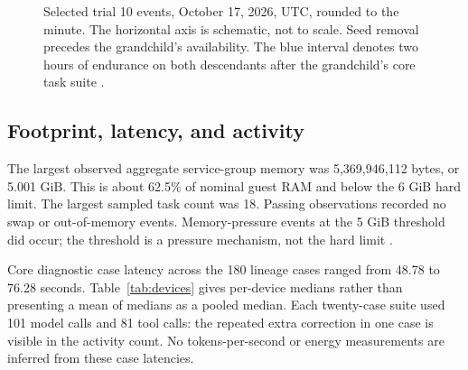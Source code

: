 \documentclass[11pt,letterpaper]{article}
\begin{document}
\begin{figure}[htbp]
\centering
{}
\caption{Selected trial 10 events, October 17, 2026, UTC, rounded to the minute.
The horizontal axis is schematic, not to scale. Seed removal precedes the
grandchild's availability. The blue interval denotes two hours of endurance
on both descendants after the grandchild's core task suite
\cite{lineages}.}
\label{fig:timeline}
\end{figure}

\subsection{Footprint, latency, and activity}

The largest observed aggregate service-group memory was 5,369,946,112 bytes,
or 5.001 GiB. This is about 62.5\% of nominal guest RAM and below the 6 GiB
hard limit. The largest sampled task count was 18. Passing observations recorded
no swap or out-of-memory events. Memory-pressure events at the 5 GiB threshold
did occur; the threshold is a pressure mechanism, not the hard limit
\cite{measurements,native,lineages}.

Core diagnostic case latency across the 180 lineage cases ranged from 48.78
to 76.28 seconds. Table~\ref{tab:devices} gives per-device medians rather than
presenting a mean of medians as a pooled median. Each twenty-case suite used
101 model calls and 81 tool calls: the repeated extra correction in one case
is visible in the activity count. No tokens-per-second or energy measurements
are inferred from these case latencies.
\end{document}
